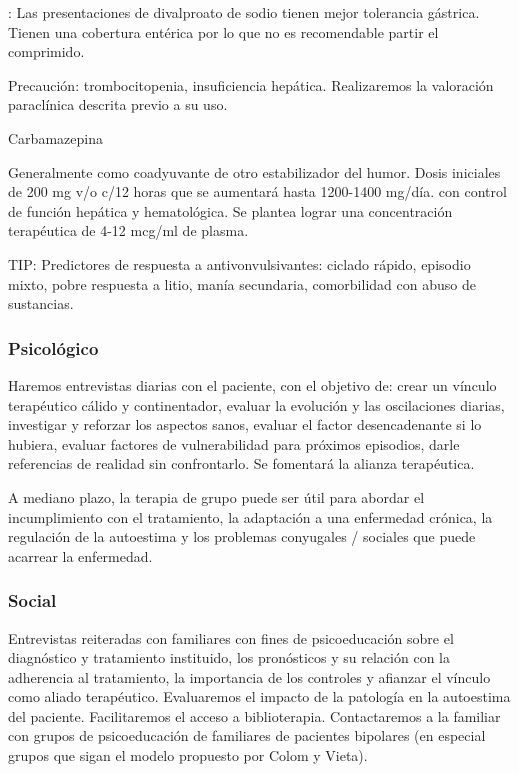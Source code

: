 \faExclamationTriangle : Las presentaciones de divalproato de sodio tienen mejor tolerancia gástrica. Tienen una cobertura entérica por lo que no es recomendable partir el comprimido.

Precaución: trombocitopenia, insuficiencia hepática. Realizaremos la valoración paraclínica descrita previo a su uso.

\faPills Carbamazepina

Generalmente como coadyuvante de otro estabilizador del humor. Dosis iniciales de 200 mg v/o c/12 horas que se aumentará hasta 1200-1400 mg/día. con control de función hepática y hematológica. Se plantea lograr una concentración terapéutica de 4-12 mcg/ml de plasma.

TIP: Predictores de respuesta a antivonvulsivantes: ciclado rápido, episodio mixto, pobre respuesta a litio, manía secundaria, comorbilidad con abuso de sustancias.

\subsubsection*{Psicológico}
Haremos entrevistas diarias con el paciente, con el objetivo de: crear un vínculo terapéutico cálido y continentador, evaluar la evolución y las oscilaciones diarias, investigar y reforzar los aspectos sanos, evaluar el factor desencadenante si lo hubiera, evaluar factores de vulnerabilidad para próximos episodios, darle referencias de realidad sin confrontarlo. Se fomentará la alianza terapéutica.

A mediano plazo, la terapia de grupo puede ser útil para abordar el incumplimiento con el tratamiento, la adaptación a una enfermedad crónica, la regulación de la autoestima y los problemas conyugales / sociales que puede acarrear la enfermedad.

\subsubsection*{Social}
Entrevistas reiteradas con familiares con fines de psicoeducación sobre el diagnóstico y tratamiento instituido, los pronósticos y su relación con la adherencia al tratamiento, la importancia de los controles y afianzar el vínculo como aliado terapéutico. Evaluaremos el impacto de la patología en la autoestima del paciente. Facilitaremos el acceso a biblioterapia. Contactaremos a la familiar con grupos de psicoeducación de familiares de pacientes bipolares (en especial grupos que sigan el modelo propuesto por Colom y Vieta).

